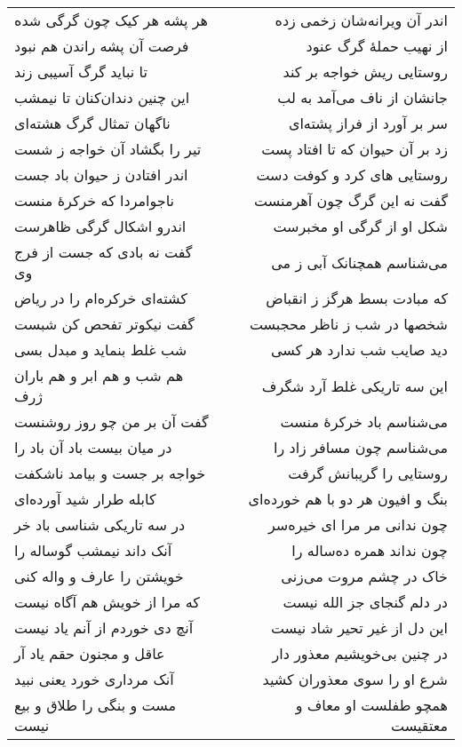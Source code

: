 \begin{center}
\begin{longtable}{l p{0.5cm} r}
\\
هر پشه هر کیک چون گرگی شده
&&
اندر آن ویرانه‌شان زخمی زده
\\
فرصت آن پشه راندن هم نبود
&&
از نهیب حملهٔ گرگ عنود
\\
تا نباید گرگ آسیبی زند
&&
روستایی ریش خواجه بر کند
\\
این چنین دندان‌کنان تا نیمشب
&&
جانشان از ناف می‌آمد به لب
\\
ناگهان تمثال گرگ هشته‌ای
&&
سر بر آورد از فراز پشته‌ای
\\
تیر را بگشاد آن خواجه ز شست
&&
زد بر آن حیوان که تا افتاد پست
\\
اندر افتادن ز حیوان باد جست
&&
روستایی های کرد و کوفت دست
\\
ناجوامردا که خرکرهٔ منست
&&
گفت نه این گرگ چون آهرمنست
\\
اندرو اشکال گرگی ظاهرست
&&
شکل او از گرگی او مخبرست
\\
گفت نه بادی که جست از فرج وی
&&
می‌شناسم همچنانک آبی ز می
\\
کشته‌ای خرکره‌ام را در ریاض
&&
که مبادت بسط هرگز ز انقباض
\\
گفت نیکوتر تفحص کن شبست
&&
شخصها در شب ز ناظر محجبست
\\
شب غلط بنماید و مبدل بسی
&&
دید صایب شب ندارد هر کسی
\\
هم شب و هم ابر و هم باران ژرف
&&
این سه تاریکی غلط آرد شگرف
\\
گفت آن بر من چو روز روشنست
&&
می‌شناسم باد خرکرهٔ منست
\\
در میان بیست باد آن باد را
&&
می‌شناسم چون مسافر زاد را
\\
خواجه بر جست و بیامد ناشکفت
&&
روستایی را گریبانش گرفت
\\
کابله طرار شید آورده‌ای
&&
بنگ و افیون هر دو با هم خورده‌ای
\\
در سه تاریکی شناسی باد خر
&&
چون ندانی مر مرا ای خیره‌سر
\\
آنک داند نیمشب گوساله را
&&
چون نداند همره ده‌ساله را
\\
خویشتن را عارف و واله کنی
&&
خاک در چشم مروت می‌زنی
\\
که مرا از خویش هم آگاه نیست
&&
در دلم گنجای جز الله نیست
\\
آنچ دی خوردم از آنم یاد نیست
&&
این دل از غیر تحیر شاد نیست
\\
عاقل و مجنون حقم یاد آر
&&
در چنین بی‌خویشیم معذور دار
\\
آنک مرداری خورد یعنی نبید
&&
شرع او را سوی معذوران کشید
\\
مست و بنگی را طلاق و بیع نیست
&&
همچو طفلست او معاف و معتقیست
\\

\end{longtable}
\end{center}
